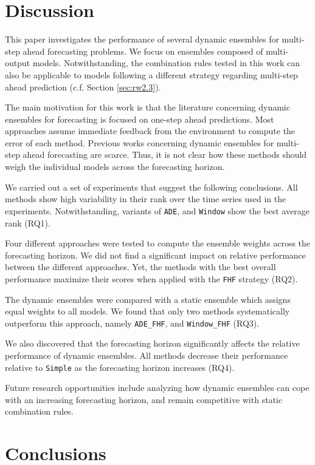 \documentclass[smallcondensed]{svjour3}
\begin{document}
\section{Discussion}\label{sec:disc}

This paper investigates the performance of several dynamic ensembles for multi-step ahead forecasting problems. We focus on ensembles composed of multi-output models. Notwithstanding, the combination rules tested in this work can also be applicable to models following a different strategy regarding multi-step ahead prediction (c.f. Section \ref{sec:rw2.3}).

The main motivation for this work is that the literature concerning dynamic ensembles for forecasting is focused on one-step ahead predictions. Most approaches assume immediate feedback from the environment to compute the error of each method. Previous works concerning dynamic ensembles for multi-step ahead forecasting are scarce. Thus, it is not clear how these methods should weigh the individual models across the forecasting horizon.

We carried out a set of experiments that suggest the following conclusions. All methods show high variability in their rank over the time series used in the experiments. Notwithstanding, variants of \texttt{ADE}, and \texttt{Window} show the best average rank (RQ1).

Four different approaches were tested to compute the ensemble weights across the forecasting horizon. We did not find a significant impact on relative performance between the different approaches. Yet, the methods with the best overall performance maximize their scores when applied with the \texttt{FHF} strategy (RQ2).

The dynamic ensembles were compared with a static ensemble which assigns equal weights to all models. We found that only two methods systematically outperform this approach, namely \texttt{ADE\_FHF}, and \texttt{Window\_FHF} (RQ3).

We also discovered that the forecasting horizon significantly affects the relative performance of dynamic ensembles. All methods  decrease their performance relative to \texttt{Simple} as the forecasting horizon increases (RQ4).

Future research opportunities include analyzing how dynamic ensembles can cope with an increasing forecasting horizon, and remain competitive with static combination rules.


\section{Conclusions}\label{sec:fr}
\end{document}
